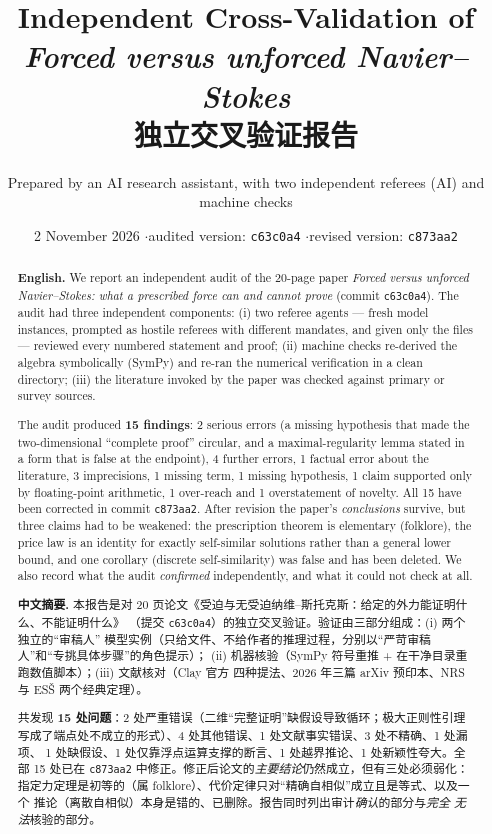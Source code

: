 \documentclass[11pt,a4paper]{article}
\title{\bfseries Independent Cross-Validation of\\[2pt]
\emph{Forced versus unforced Navier--Stokes}\\[8pt]
\large 独立交叉验证报告}
\author{Prepared by an AI research assistant, with two independent referees (AI) and machine checks}
\date{2 November 2026 \quad$\cdot$\quad audited version: \texttt{c63c0a4} \quad$\cdot$\quad revised version: \texttt{c873aa2}}
\begin{document}
\maketitle

\begin{abstract}
\noindent\textbf{English.} We report an independent audit of the 20-page paper
\emph{Forced versus unforced Navier--Stokes: what a prescribed force can and cannot prove}
(commit \texttt{c63c0a4}). The audit had three independent components: (i) two referee agents
--- fresh model instances, prompted as hostile referees with different mandates, and given only
the files --- reviewed every numbered statement and proof; (ii) machine checks re-derived the
algebra symbolically (SymPy) and re-ran the numerical verification in a clean directory;
(iii) the literature invoked by the paper was checked against primary or survey sources.

The audit produced \textbf{15 findings}: 2 serious errors (a missing hypothesis that made the
two-dimensional ``complete proof'' circular, and a maximal-regularity lemma stated in a form
that is false at the endpoint), 4 further errors, 1 factual error about the literature,
3 imprecisions, 1 missing term, 1 missing hypothesis, 1 claim supported only by floating-point
arithmetic, 1 over-reach and 1 overstatement of novelty. All 15 have been corrected in
commit \texttt{c873aa2}. After revision the paper's \emph{conclusions} survive, but three
claims had to be weakened: the prescription theorem is elementary (folklore), the price law is
an identity for exactly self-similar solutions rather than a general lower bound, and one
corollary (discrete self-similarity) was false and has been deleted. We also record what the
audit \emph{confirmed} independently, and what it could not check at all.

\medskip
\noindent\textbf{中文摘要.}
本报告是对 20 页论文《受迫与无受迫纳维--斯托克斯：给定的外力能证明什么、不能证明什么》
（提交 \texttt{c63c0a4}）的独立交叉验证。验证由三部分组成：(i) 两个独立的“审稿人”
模型实例（只给文件、不给作者的推理过程，分别以“严苛审稿人”和“专挑具体步骤”的角色提示）；
(ii) 机器核验（SymPy 符号重推 + 在干净目录重跑数值脚本）；(iii) 文献核对（Clay 官方
四种提法、2026 年三篇 arXiv 预印本、NRS 与 ES\v{S} 两个经典定理）。

共发现 \textbf{15 处问题}：2 处严重错误（二维“完整证明”缺假设导致循环；极大正则性引理
写成了端点处不成立的形式）、4 处其他错误、1 处文献事实错误、3 处不精确、1 处漏项、
1 处缺假设、1 处仅靠浮点运算支撑的断言、1 处越界推论、1 处新颖性夸大。全部 15 处已在
\texttt{c873aa2} 中修正。修正后论文的\emph{主要结论}仍然成立，但有三处必须弱化：
指定力定理是初等的（属 folklore）、代价定律只对“精确自相似”成立且是等式、以及一个
推论（离散自相似）本身是错的、已删除。报告同时列出审计\emph{确认}的部分与\emph{完全
无法}核验的部分。
\end{abstract}
\end{document}
